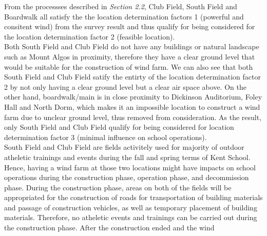 \documentclass[review]{elsarticle}
\begin{document}

From the processses described in \textit{Section 2.2}, Club Field, South Field and Boardwalk all satisfy the the location determination factors 1 (powerful and consitent wind) 
from the survey result and thus qualify for being considered for the location determination factor 2 (feasible location).  %
\\\indent Both South Field and Club Field do not have any buildings or natural landscape such as Mount Algos in proximity, therefore they have a clear ground level that would 
be suitable for the construction of wind farm. We can also see that both South Field and Club Field satify the entirty of the location determination factor 2 by not only having 
a clear ground level but a clear air space above. On the other hand, boardwalk/main is in close proximity to Dickinson Auditorium, Foley Hall and North Dorm, which makes it an 
impossible location to construct a wind farm due to unclear ground level, thus removed from consideration. As the result, only South Field and Club Field qualify for being 
considered for location determination factor 3 (minimal influence on school operations).
\\\indent South Field and Club Field are fields activitely used for majority of outdoor atheletic trainings and events during the fall and spring terms of Kent School. Hence, 
having a wind farm at those two locations might have impacts on school operations during the construction phase, operation phase, and decommission phase. During the construction 
phase, areas on both of the fields will be appropriated for the construction of roads for transportation of building materials and passage of construction vehicles, as well as
temporary placement of building materials. Therefore, no atheletic events and trainings can be carried out during the construction phase. After the construction ended and the wind 
\end{document}
